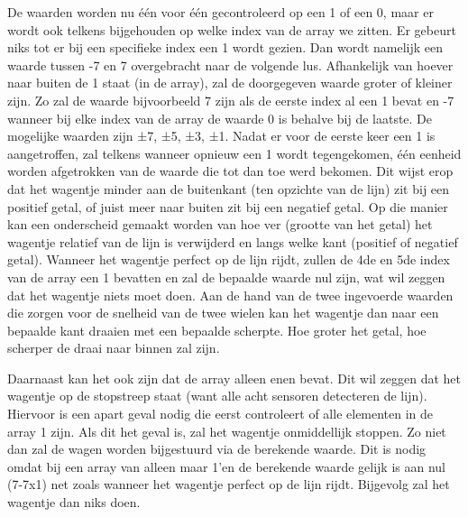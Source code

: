 \documentclass[twoside,kulak]{kulakreport} %
\begin{document}
		
		De waarden worden nu één voor één gecontroleerd op een 1 of een 0, maar er wordt ook telkens bijgehouden op welke index van de array we zitten. Er gebeurt niks tot er bij een specifieke index een 1 wordt gezien. Dan wordt namelijk een waarde tussen -7 en 7 overgebracht naar de volgende lus. Afhankelijk van hoever naar buiten de 1 staat (in de array), zal de doorgegeven waarde groter of kleiner zijn. Zo zal de waarde bijvoorbeeld 7 zijn als de eerste index al een 1 bevat en -7 wanneer bij elke index van de array de waarde 0 is behalve bij de laatste. De mogelijke waarden zijn ±7, ±5, ±3, ±1. Nadat er voor de eerste keer een 1 is aangetroffen, zal telkens wanneer opnieuw een 1 wordt tegengekomen, één eenheid worden afgetrokken van de waarde die tot dan toe werd bekomen. Dit wijst erop dat het wagentje minder aan de buitenkant (ten opzichte van de lijn) zit bij een positief getal, of juist meer naar buiten zit bij een negatief getal. Op die manier kan een onderscheid gemaakt worden van hoe ver (grootte van het getal) het wagentje relatief van de lijn is verwijderd en langs welke kant (positief of negatief getal). Wanneer het wagentje perfect op de lijn rijdt, zullen de 4de en 5de index van de array een 1 bevatten en zal de bepaalde waarde nul zijn, wat wil zeggen dat het wagentje niets moet doen. Aan de hand van de twee ingevoerde waarden die zorgen voor de snelheid van de twee wielen kan het wagentje dan naar een bepaalde kant draaien met een bepaalde scherpte. Hoe groter het getal, hoe scherper de draai naar binnen zal zijn.
		
		Daarnaast kan het ook zijn dat de array alleen enen bevat. Dit wil zeggen dat het wagentje op de stopstreep staat (want alle acht sensoren detecteren de lijn). Hiervoor is een apart geval nodig die eerst controleert of alle elementen in de array 1 zijn. Als dit het geval is, zal het wagentje onmiddellijk stoppen. Zo niet dan zal de wagen worden bijgestuurd via de berekende waarde. Dit is nodig omdat bij een array van alleen maar 1’en de berekende waarde gelijk is aan nul (7-7x1) net zoals wanneer het wagentje perfect op de lijn rijdt. Bijgevolg zal het wagentje dan niks doen.
		
\end{document}
